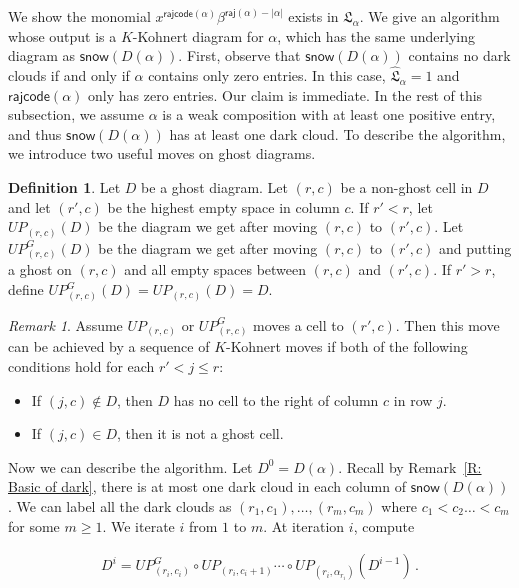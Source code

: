 \documentclass[10pt]{amsart}
\theoremstyle{plain}
\theoremstyle{plain}
\theoremstyle{definition}
\theoremstyle{definition}
\newtheorem{defn}[defn]{Definition}
\theoremstyle{definition}
\theoremstyle{plain}
\theoremstyle{plain}
\theoremstyle{plain}
\theoremstyle{plain}
\theoremstyle{plain}
\theoremstyle{remark}
\newtheorem{rem}[rem]{Remark}
\theoremstyle{remark}
\theoremstyle{plain}
\theoremstyle{plain}
\newcommand{\fL}{\mathfrak{L}}
\newcommand{\fLb}{\fL}
\newcommand{\topLas}{\widehat{\fL}}
\newcommand{\snow}{\mathsf{snow}}
\newcommand{\rajcode}{\mathsf{rajcode}}
\newcommand{\raj}{\mathsf{raj}}
\begin{document}
We show the monomial $ x^{\rajcode(\alpha)}\beta^{\raj(\alpha) - |\alpha|}$ 
exists in $\fLb_\alpha$.
We give an algorithm whose output is a $K$-Kohnert diagram for $\alpha$, which has the same underlying diagram as $\snow(D(\alpha))$. First, observe that $\snow(D(\alpha))$ contains no dark clouds if and only if $\alpha$ contains only zero entries. In this case, $\topLas_\alpha = 1$ and $\rajcode(\alpha)$ only has zero entries. Our claim is immediate. 
In the rest of this subsection, we assume $\alpha$ is a weak composition
with at least one positive entry, and thus $\snow(D(\alpha))$ has at least one dark cloud.
To describe the algorithm, 
we introduce two useful moves on ghost diagrams.
\begin{defn}
Let $D$ be a ghost diagram.
Let $(r,c)$ be a non-ghost cell in $D$
and let $(r', c)$ be the highest empty space in column $c$.
If $r' < r$,
let $UP_{(r,c)}(D)$ be the diagram we get after 
moving $(r,c)$ to $(r',c)$. 
Let $UP^G_{(r,c)}(D)$ be the diagram we get after 
moving $(r,c)$ to $(r',c)$
and putting a ghost on $(r,c)$ and all empty spaces between $(r,c)$ and $(r',c)$.
If $r' > r$, define 
$UP^G_{(r,c)}(D) = UP_{(r,c)}(D) = D$.
\end{defn}

\begin{rem}
\label{R: K-Kohnert move}
Assume $UP_{(r,c)}$ or $UP^G_{(r,c)}$ moves a cell to $(r',c)$.
Then this move can be achieved by a sequence of $K$-Kohnert moves
if both of the following conditions hold for each $r' < j \leq r$:
\begin{itemize}
\item If $(j, c)\notin D$,
then $D$ has no cell to the right of column $c$ in row $j$.
\item If $(j, c)\in D$, then it is not a ghost cell.
\end{itemize}
\end{rem}


Now we can describe the algorithm.
Let $D^{0} = D(\alpha)$. Recall by Remark~\ref{R: Basic of dark}, there is at most one dark cloud in each column of $\snow(D(\alpha))$. 
We can label all the dark clouds as $(r_1,c_1),\dots, (r_{m},c_{m})$ where $c_1<c_2\dots <c_m$ for some $m\geqslant 1$. We iterate $i$ from $1$ to $m$.
At iteration $i$, compute

\begin{align}
\label{EQ: UP}
D^i = UP^G_{(r_i,c_i)} \circ UP_{(r_i,c_i + 1)} \cdots \circ UP_{(r_i,\alpha_{r_i})} (D^{i-1})\,.    
\end{align}
\end{document}
